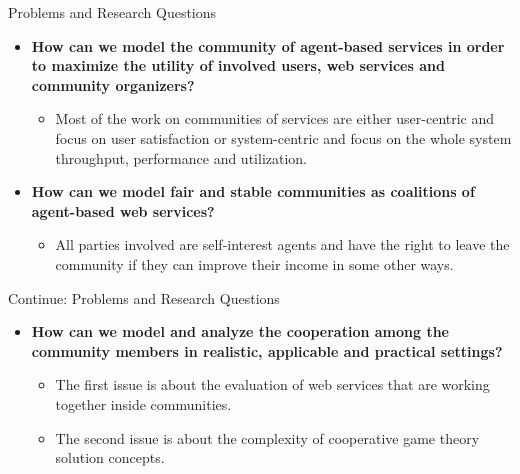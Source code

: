 \documentclass{beamer}
\begin{document}
\begin{frame}{Problems and Research Questions}

\begin{itemize}
    \item \textbf{How can we model the
        community of agent-based services in order to maximize the utility
        of involved users, web services and community organizers?}
        \begin{itemize}
            \item Most of the work on communities of
            services are either user-centric and focus on user satisfaction
            or system-centric and focus on the whole system throughput, performance and utilization.
        \end{itemize}


    \item \textbf{How can we model fair and stable communities as coalitions
        of agent-based web services?}
        \begin{itemize}
            \item All parties involved are self-interest agents and have the right to leave the community if they can improve their income in some other ways.
        \end{itemize}

\end{itemize}

\end{frame}

\begin{frame}{Continue: Problems and Research Questions}
 \begin{itemize}
   \item \textbf{How can we model and analyze the cooperation
        among the community members in realistic, applicable and practical
        settings?}
        \begin{itemize}
            \item The first issue is about the evaluation of web services that are working together inside communities.
            \item The second issue is about the complexity of cooperative game theory solution concepts.
        \end{itemize}

\end{itemize}
\end{frame}
\end{document}

